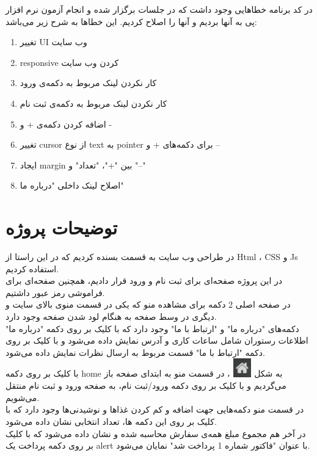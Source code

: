 \documentclass[a4paper, 12pt]{report}
\begin{document}
در کد برنامه خطاهایی وجود داشت که در جلسات برگزار شده و انجام آزمون نرم افزار پی به آنها بردیم و  آنها را اصلاح کردیم. این خطاها به شرح زیر می‌باشد:

\begin{enumerate}
	\item 
تغییر UI وب سایت
	\item
	responsive کردن وب سایت
	\item	
	کار نکردن لینک مربوط به دکمه‌ی ورود	
	\item
	کار نکردن لینک مربوط به دکمه‌ی ثبت نام
	\item	
	اضافه کردن دکمه‌ی + و -
	\item
	تغییر cursor از نوع text به pointer برای دکمه‌های + و –
	\item
	ایجاد margin بین "+"، "تعداد" و "–" 
	\item
	اصلاح لینک داخلی "درباره ما"	
\end{enumerate}

\chapter{توضیحات پروژه}

\indent
در طراحی وب سایت به قسمت  بسنده کردیم که در این راستا از Html ، CSS و Js استفاده کردیم.\\

در این پروژه صفحه‌ای برای ثبت نام و ورود قرار دادیم، همچنین صفحه‌ای برای فراموشی رمز عبور داشتیم.\\

در صفحه اصلی 2 دکمه برای مشاهده منو که یکی در قسمت منوی بالای سایت و دیگری در وسط صفحه به هنگام لود شدن صفحه وجود دارد.\\

دکمه‌های "درباره ما" و "ارتباط با ما" وجود دارد که با کلیک بر روی دکمه "درباره ما" اطلاعات رستوران شامل ساعات کاری و آدرس نمایش داده می‌شود و با کلیک بر روی دکمه "ارتباط با ما" قسمت مربوط به ارسال نظرات نمایش داده می‌شود.\\

با کلیک بر روی دکمه home به شکل 
\includegraphics[width=0.8cm, height=0.8cm]{home}
، در قسمت منو به ابتدای صفحه باز می‌گردیم و با کلیک بر روی دکمه ورود/ثبت نام، به صفحه ورود و ثبت نام منتقل می‌شویم.\\

در قسمت منو دکمه‌هایی جهت اضافه و کم کردن غذاها و نوشیدنی‌ها وجود دارد که با کلیک بر روی این دکمه ها، تعداد انتخابی نشان داده می‌شود.\\

در آخر هم مجموع مبلغ همه‌ی سفارش محاسبه شده و نشان داده می‌شود که با کلیک بر روی دکمه پرداخت یک alert با عنوان "فاکتور شماره 1 پرداخت شد" نمایان می‌شود.
\end{document}
